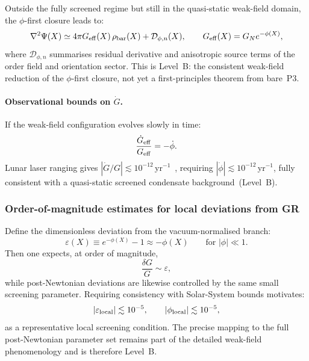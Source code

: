 Outside the fully screened regime but still in the quasi-static
weak-field domain, the $\phi$-first closure leads to:
\begin{equation}
  \label{eq:mod_Poisson}
  \nabla^2\Psi(X)
  \simeq
  4\pi G_{\rm eff}(X)\,\rho_{\rm bar}(X)
  + \mathcal{D}_{\phi,n}(X),
  \qquad
  G_{\rm eff}(X) = G_N e^{-\phi(X)},
\end{equation}
where $\mathcal{D}_{\phi,n}$ summarises residual derivative and
anisotropic source terms of the order field and orientation sector.
This is Level~B: the consistent weak-field reduction of the $\phi$-first
closure, not yet a first-principles theorem from bare~P3.

\paragraph{Observational bounds on $\dot G$.}
If the weak-field configuration evolves slowly in time:
\begin{equation}
  \label{eq:Gdot_over_G}
  \frac{\dot G_{\rm eff}}{G_{\rm eff}} = -\dot\phi.
\end{equation}
Lunar laser ranging gives $|\dot G/G|\lesssim 10^{-12}$\,yr$^{-1}$~\cite{Uzan2011},
requiring $|\dot\phi|\lesssim 10^{-12}$\,yr$^{-1}$, fully consistent
with a quasi-static screened condensate background~(Level~B).

\subsubsection*{Order-of-magnitude estimates for local deviations from GR}

Define the dimensionless deviation from the vacuum-normalised branch:
\begin{equation}
  \label{eq:epsilon_dev}
  \varepsilon(X)\equiv e^{-\phi(X)}-1\approx -\phi(X)
  \qquad\text{for }|\phi|\ll 1.
\end{equation}
Then one expects, at order of magnitude,
\[
\frac{\delta G}{G}\sim\varepsilon,
\]
while post-Newtonian deviations are likewise controlled by the same
small screening parameter.
Requiring consistency with Solar-System bounds motivates:
\begin{equation}
  \label{eq:epsilon_local_bound}
  |\varepsilon_{\rm local}|\lesssim 10^{-5},
  \qquad
  |\phi_{\rm local}|\lesssim 10^{-5},
\end{equation}
as a representative local screening condition.
The precise mapping to the full post-Newtonian parameter set remains
part of the detailed weak-field phenomenology and is therefore Level~B.

